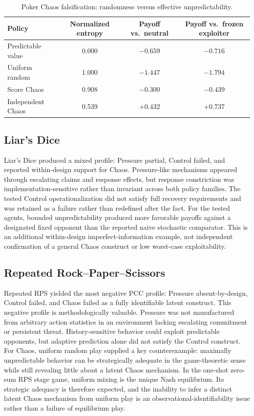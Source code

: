 \documentclass[journal]{IEEEtran}
\begin{document}
\begin{table}[t]
\caption{Poker Chaos falsification: randomness versus effective unpredictability.}
\label{tab:pokerchaos}
\centering
\begin{tabular}{lccc}
\toprule
\textbf{Policy} & \textbf{Normalized entropy} & \textbf{Payoff vs.\ neutral} & \textbf{Payoff vs.\ frozen exploiter} \\
\midrule
Predictable value & 0.000 & $-0.659$ & $-0.716$ \\
Uniform random & 1.000 & $-1.447$ & $-1.794$ \\
Score Chaos & 0.908 & $-0.300$ & $-0.439$ \\
Independent Chaos & 0.539 & $+0.432$ & $+0.737$ \\
\bottomrule
\end{tabular}
\end{table}

\subsection{Liar's Dice}

Liar's Dice produced a mixed profile: Pressure partial, Control failed, and reported within-design support for Chaos. Pressure-like mechanisms appeared through escalating claims and response effects, but response constriction was implementation-sensitive rather than invariant across both policy families. The tested Control operationalization did not satisfy full recovery requirements and was retained as a failure rather than redefined after the fact. For the tested agents, bounded unpredictability produced more favorable payoffs against a designated fixed opponent than the reported naive stochastic comparator. This is an additional within-design imperfect-information example, not independent confirmation of a general Chaos construct or low worst-case exploitability.

\subsection{Repeated Rock--Paper--Scissors}

Repeated RPS yielded the most negative PCC profile: Pressure absent-by-design, Control failed, and Chaos failed as a fully identifiable latent construct. This negative profile is methodologically valuable. Pressure was not manufactured from arbitrary action statistics in an environment lacking escalating commitment or persistent threat. History-sensitive behavior could exploit predictable opponents, but adaptive prediction alone did not satisfy the Control construct. For Chaos, uniform random play supplied a key counterexample: maximally unpredictable behavior can be strategically adequate in the game-theoretic sense while still revealing little about a latent Chaos mechanism. In the one-shot zero-sum RPS stage game, uniform mixing is the unique Nash equilibrium. Its strategic adequacy is therefore expected, and the inability to infer a distinct latent Chaos mechanism from uniform play is an observational-identifiability issue rather than a failure of equilibrium play.
\end{document}
